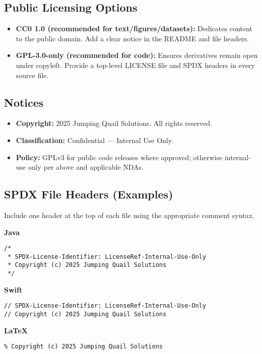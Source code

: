 \documentclass[12pt,a4paper]{article}
\begin{document}
\subsection*{Public Licensing Options}
\begin{itemize}[leftmargin=*]
  \item \textbf{CC0 1.0 (recommended for text/figures/datasets):} Dedicates content to the public domain. Add a clear notice in the README and file headers.
  \item \textbf{GPL-3.0-only (recommended for code):} Ensures derivatives remain open under copyleft. Provide a top-level LICENSE file and SPDX headers in every source file.
\end{itemize}

\subsection*{Notices}
\begin{itemize}[leftmargin=*]
  \item \textbf{Copyright:} \textcopyright{} 2025 Jumping Quail Solutions. All rights reserved.
  \item \textbf{Classification:} Confidential — Internal Use Only.
  \item \textbf{Policy:} GPLv3 for public code releases where approved; otherwise internal-use only per above and applicable NDAs.
\end{itemize}

\subsection*{SPDX File Headers (Examples)}
Include one header at the top of each file using the appropriate comment syntax.

\noindent\textbf{Java}
\begin{lstlisting}[style=code]
/*
 * SPDX-License-Identifier: LicenseRef-Internal-Use-Only
 * Copyright (c) 2025 Jumping Quail Solutions
 */
\end{lstlisting}

\noindent\textbf{Swift}
\begin{lstlisting}[style=code]
// SPDX-License-Identifier: LicenseRef-Internal-Use-Only
// Copyright (c) 2025 Jumping Quail Solutions
\end{lstlisting}

\noindent\textbf{LaTeX}
\begin{lstlisting}[style=code]
% SPDX-License-Identifier: LicenseRef-Internal-Use-Only
% Copyright (c) 2025 Jumping Quail Solutions
\end{lstlisting}
\end{document}
